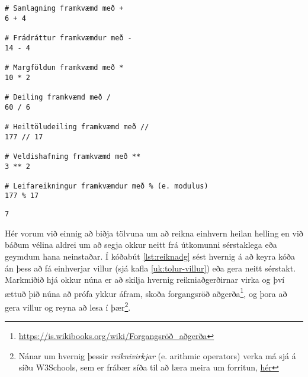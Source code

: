 \begin{lstlisting}[caption=Reikniaðgerðir, label=lst:reiknadg]
# Samlagning framkvæmd með + 
6 + 4 

# Frádráttur framkvæmdur með -
14 - 4 

# Margföldun framkvæmd með * 
10 * 2 

# Deiling framkvæmd með / 
60 / 6 

# Heiltöludeiling framkvæmd með //
177 // 17

# Veldishafning framkvæmd með **
3 ** 2

# Leifareikningur framkvæmdur með % (e. modulus)
177 % 17
\end{lstlisting}
\lstset{style=uttak}
\begin{lstlisting}
7
\end{lstlisting}
\lstset{style=venjulegt}

Hér vorum við einnig að biðja tölvuna um að reikna einhvern heilan helling en við báðum vélina aldrei um að segja okkur neitt frá útkomunni sérstaklega eða geymdum hana neinstaðar.
Í kóðabút \ref{lst:reiknadg} sést hvernig á að keyra kóða án þess að fá einhverjar villur (sjá kafla \ref{uk:tolur-villur}) eða gera neitt sérstakt.
Markmiðið hjá okkur núna er að skilja hvernig reikniaðgerðirnar virka og því ættuð þið núna að prófa ykkur áfram, skoða forgangsröð aðgerða\footnote{\href{https://is.wikibooks.org/wiki/Forgangsr\%C3\%B6\%C3\%B0\_a\%C3\%B0ger\%C3\%B0a}{https://is.wikibooks.org/wiki/Forgangsröð\_aðgerða}}, og þora að gera villur og reyna að lesa í þær\footnote{Nánar um hvernig þessir \emph{reiknivirkjar} (e. arithmic operators) verka má sjá á síðu W3Schools, sem er frábær síða til að læra meira um forritun, \href{https://www.w3schools.com/python/gloss_python_arithmetic_operators.asp}{hér}}.

